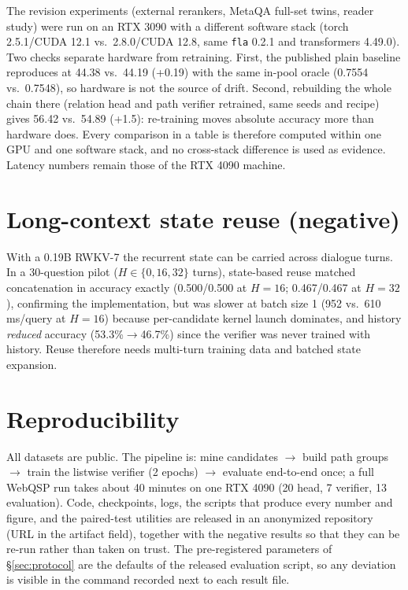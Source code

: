 \documentclass[sigconf,review,anonymous]{acmart}
\begin{document}
The revision experiments (external rerankers, MetaQA full-set twins, reader study) were run on an RTX 3090 with a different software stack (torch 2.5.1/CUDA 12.1 vs.\ 2.8.0/CUDA 12.8, same \texttt{fla} 0.2.1 and transformers 4.49.0). Two checks separate hardware from retraining. First, the published plain baseline reproduces at 44.38 vs.\ 44.19 (+0.19) with the same in-pool oracle (0.7554 vs.\ 0.7548), so hardware is not the source of drift. Second, rebuilding the whole chain there (relation head and path verifier retrained, same seeds and recipe) gives 56.42 vs.\ 54.89 (+1.5): re-training moves absolute accuracy more than hardware does. Every comparison in a table is therefore computed within one GPU and one software stack, and no cross-stack difference is used as evidence. Latency numbers remain those of the RTX 4090 machine.

\section{Long-context state reuse (negative)}
\label{app:longctx}
With a 0.19B RWKV-7 the recurrent state can be carried across dialogue turns. In a 30-question pilot ($H\in\{0,16,32\}$ turns), state-based reuse matched concatenation in accuracy exactly (0.500/0.500 at $H=16$; 0.467/0.467 at $H=32$), confirming the implementation, but was slower at batch size 1 (952 vs.\ 610 ms/query at $H=16$) because per-candidate kernel launch dominates, and history \emph{reduced} accuracy (53.3\%$\to$46.7\%) since the verifier was never trained with history. Reuse therefore needs multi-turn training data and batched state expansion.

\section{Reproducibility}
\label{app:repro}
All datasets are public. The pipeline is: mine candidates $\rightarrow$ build path groups $\rightarrow$ train the listwise verifier (2 epochs) $\rightarrow$ evaluate end-to-end once; a full WebQSP run takes about 40 minutes on one RTX 4090 (20 head, 7 verifier, 13 evaluation). Code, checkpoints, logs, the scripts that produce every number and figure, and the paired-test utilities are released in an anonymized repository (URL in the artifact field), together with the negative results so that they can be re-run rather than taken on trust. The pre-registered parameters of \S\ref{sec:protocol} are the defaults of the released evaluation script, so any deviation is visible in the command recorded next to each result file.
\end{document}
